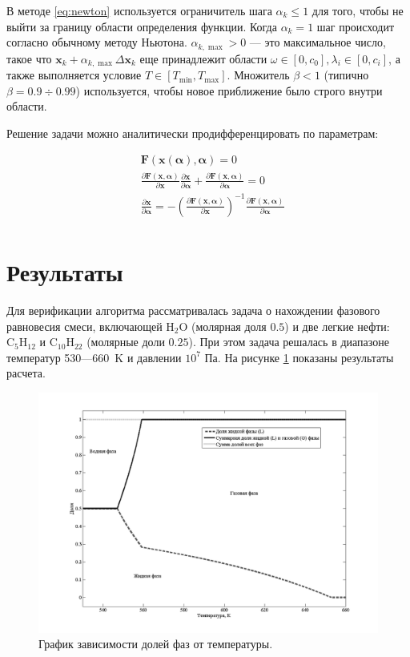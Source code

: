 \documentclass[12pt]{article}
\newcommand{\pd}[2]{\frac{\partial #1}{\partial #2}}
\let\dividesymbol\div
\renewcommand{\div}{\operatorname{div}}
\renewcommand{\leq}{\leqslant}
\begin{document}
В методе \eqref{eq:newton} используется ограничитель шага $\alpha_k \leq 1$ для того, чтобы не выйти за границу области определения функции. Когда $\alpha_k = 1$ шаг происходит согласно обычному методу Ньютона. $\alpha_{k, \max} > 0$ --- это максимальное число, такое что $\mathbf{x}_k + \alpha_{k,\max} \Delta \mathbf{x}_{k}$ еще принадлежит области $\omega \in [0,c_0], \lambda_i \in [0, c_i]$, а также выполняется условие $T \in [T_{\min}, T_{\max}]$. Множитель $\beta < 1$ (типично $\beta = 0.9 \dividesymbol 0.99$) используется, чтобы новое приближение было строго внутри области.

Решение задачи можно аналитически продифференцировать по параметрам:

\begin{equation}
\begin{aligned}
&\mathbf{F}(\mathbf{x}(\boldsymbol \alpha), \boldsymbol \alpha) = 0\\
&\pd{\mathbf{F}(\mathbf{x}, \boldsymbol \alpha)}{\mathbf{x}} \pd{\mathbf{x}}{\boldsymbol \alpha} + \pd{\mathbf{F}(\mathbf{x}, \boldsymbol \alpha)}{\boldsymbol \alpha} = 0\\
&\pd{\mathbf{x}}{\boldsymbol \alpha} = -\left(\pd{\mathbf{F}(\mathbf{x}, \boldsymbol \alpha)}{\mathbf{x}}\right)^{-1} \pd{\mathbf{F}(\mathbf{x}, \boldsymbol \alpha)}{\boldsymbol \alpha} \\
\end{aligned}
\end{equation}

\section{Результаты}
Для верификации алгоритма рассматривалась задача о нахождении фазового равновесия смеси, включающей $\mathrm{H_2O}$ (молярная доля $0.5$) и две легкие нефти: $\mathrm{C_5H_{12}}$ и $\mathrm{C_{10}H_{22}}$ (молярные доли $0.25$). При этом задача решалась в диапазоне температур 530---660~K и давлении $10^7$ Па. На рисунке \ref{fig:1} показаны результаты расчета. 

\begin{figure}
	\centering
	\includegraphics[width=\textwidth]{Figure1.png}
	\caption{График зависимости долей фаз от температуры.}
	\label{fig:1}
\end{figure}
\end{document}
